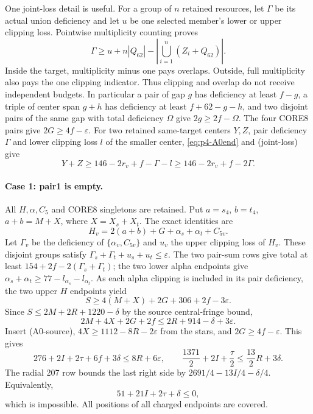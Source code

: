 \documentclass[11pt,letterpaper]{article}
\theoremstyle{definition}\newtheorem{definition}[theorem]{Definition}
\begin{document}
One joint-loss detail is useful. For a group of $n$ retained resources,
let $\Gamma$ be its actual union deficiency and let $u$ be one selected
member's lower or upper clipping loss. Pointwise multiplicity counting
proves
\[
 \Gamma\ge u+n|Q_{62}|-\left|\bigcup_{i=1}^n(Z_i+Q_{62})\right|.
                                                        \tag{joint-loss}
\]
Inside the target, multiplicity minus one pays overlaps. Outside,
full multiplicity also pays the one clipping indicator. Thus clipping
and overlap do not receive independent budgets. In particular a pair of
gap $g$ has deficiency at least $f-g$, a triple of center span $g+h$
has deficiency at least $f+62-g-h$, and two disjoint pairs of the same
gap with total deficiency $\Omega$ give $2g\ge2f-\Omega$.
The four CORE8 pairs give $2G\ge4f-\varepsilon$.
For two retained same-target centers $Y,Z$, pair deficiency $\Gamma$ and
lower clipping loss $l$ of the smaller center, \eqref{eq:p4-A0end} and
(joint-loss) give
\begin{equation}
 Y+Z\ge146-2r_v+f-\Gamma-l
      \ge146-2r_v+f-2\Gamma.                     \label{eq:p4-pairsum}
\end{equation}

\paragraph{Case 1: pair1 is empty.}
All $H,\alpha,C_5$ and CORE8 singletons are retained.
Put $a=s_4$, $b=t_4$, $a+b=M+X$, where $X=X_s+X_t$.
The exact identities are
\[
 H_v=2(a+b)+G+\alpha_s+\alpha_t+C_{5v}.
\]
Let $\Gamma_v$ be the deficiency of $\{\alpha_v,C_{5v}\}$ and $u_v$
the upper clipping loss of $H_v$. These disjoint groups satisfy
$\Gamma_s+\Gamma_t+u_s+u_t\le\varepsilon$.
The two pair-sum rows give total at least
$154+2f-2(\Gamma_s+\Gamma_t)$; the two lower alpha endpoints give
$\alpha_s+\alpha_t\ge77-l_{\alpha_s}-l_{\alpha_t}$.
As each alpha clipping is included in its pair deficiency, the two upper
$H$ endpoints yield
\[
 S\ge4(M+X)+2G+306+2f-3\varepsilon.
\]
Since $S\le2M+2R+1220-\delta$ by the source central-fringe bound,
\[
 2M+4X+2G+2f\le2R+914-\delta+3\varepsilon.
\]
Insert (A0-source), $4X\ge1112-8R-2\varepsilon$ from the stars, and
$2G\ge4f-\varepsilon$. This gives
\[
 276+2I+2\tau+6f+3\delta\le8R+6\varepsilon,
 \qquad \frac{1371}{2}+2I+\frac\tau2\le\frac{13}{2}R+3\delta.
\]
The radial 207 row bounds the last right side by
$2691/4-13I/4-\delta/4$. Equivalently,
\begin{equation}
 51+21I+2\tau+\delta\le0,                         \label{eq:p4-A0case1}
\end{equation}
which is impossible. All positions of all charged endpoints are covered.
\end{document}
